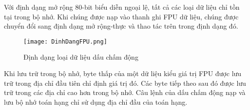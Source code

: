 	Với định dạng mở rộng 80-bit biểu diễn ngoại lệ, tất cả các loại dữ liệu chỉ tồn tại trong bộ nhớ. Khi chúng được nạp vào thanh ghi FPU dữ liệu, chúng được chuyển đổi sang định dạng mở rộng-thực và thao tác trên trong định dạng đó.
	\begin{center}
			\begin{figure}[htp]
				\begin{center}
					\texttt{[image: DinhDangFPU.png]}
				\end{center}
				\caption{Định dạng loại dữ liệu dấu chấm động}				
				\label{fig:DinhDangLoaiDL}				
			\end{figure}
		\end{center}	
		
		Khi lưu trữ trong bộ nhớ, byte thấp của một dữ liệu kiểu giá trị FPU được lưu trữ trong địa chỉ đầu tiên chỉ định giá trị đó. Các byte tiếp theo sau đó được lưu trữ trong các địa chỉ cao hơn trong bộ nhớ. Câu lệnh của dấu chấm động nạp và lưu bộ nhớ toán hạng chỉ sử dụng địa chỉ đầu của toán hạng.
		
		\newpage
